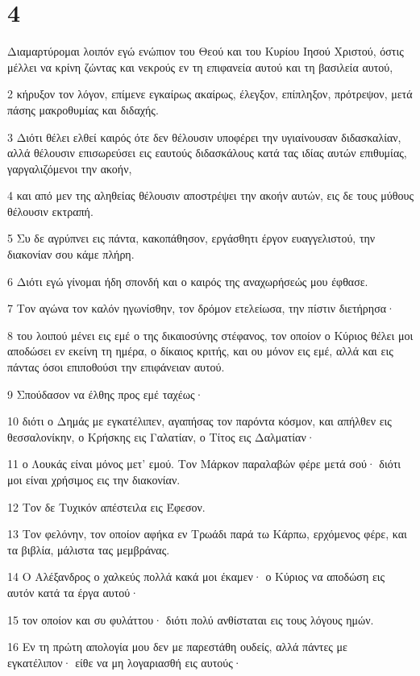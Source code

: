 \chapter{4}

\par Διαμαρτύρομαι λοιπόν εγώ ενώπιον του Θεού και του Κυρίου Ιησού Χριστού, όστις μέλλει να κρίνη ζώντας και νεκρούς εν τη επιφανεία αυτού και τη βασιλεία αυτού,
\par 2 κήρυξον τον λόγον, επίμενε εγκαίρως ακαίρως, έλεγξον, επίπληξον, πρότρεψον, μετά πάσης μακροθυμίας και διδαχής.
\par 3 Διότι θέλει ελθεί καιρός ότε δεν θέλουσιν υποφέρει την υγιαίνουσαν διδασκαλίαν, αλλά θέλουσιν επισωρεύσει εις εαυτούς διδασκάλους κατά τας ιδίας αυτών επιθυμίας, γαργαλιζόμενοι την ακοήν,
\par 4 και από μεν της αληθείας θέλουσιν αποστρέψει την ακοήν αυτών, εις δε τους μύθους θέλουσιν εκτραπή.
\par 5 Συ δε αγρύπνει εις πάντα, κακοπάθησον, εργάσθητι έργον ευαγγελιστού, την διακονίαν σου κάμε πλήρη.
\par 6 Διότι εγώ γίνομαι ήδη σπονδή και ο καιρός της αναχωρήσεώς μου έφθασε.
\par 7 Τον αγώνα τον καλόν ηγωνίσθην, τον δρόμον ετελείωσα, την πίστιν διετήρησα·
\par 8 του λοιπού μένει εις εμέ ο της δικαιοσύνης στέφανος, τον οποίον ο Κύριος θέλει μοι αποδώσει εν εκείνη τη ημέρα, ο δίκαιος κριτής, και ου μόνον εις εμέ, αλλά και εις πάντας όσοι επιποθούσι την επιφάνειαν αυτού.
\par 9 Σπούδασον να έλθης προς εμέ ταχέως·
\par 10 διότι ο Δημάς με εγκατέλιπεν, αγαπήσας τον παρόντα κόσμον, και απήλθεν εις θεσσαλονίκην, ο Κρήσκης εις Γαλατίαν, ο Τίτος εις Δαλματίαν·
\par 11 ο Λουκάς είναι μόνος μετ' εμού. Τον Μάρκον παραλαβών φέρε μετά σού· διότι μοι είναι χρήσιμος εις την διακονίαν.
\par 12 Τον δε Τυχικόν απέστειλα εις Έφεσον.
\par 13 Τον φελόνην, τον οποίον αφήκα εν Τρωάδι παρά τω Κάρπω, ερχόμενος φέρε, και τα βιβλία, μάλιστα τας μεμβράνας.
\par 14 Ο Αλέξανδρος ο χαλκεύς πολλά κακά μοι έκαμεν· ο Κύριος να αποδώση εις αυτόν κατά τα έργα αυτού·
\par 15 τον οποίον και συ φυλάττου· διότι πολύ ανθίσταται εις τους λόγους ημών.
\par 16 Εν τη πρώτη απολογία μου δεν με παρεστάθη ουδείς, αλλά πάντες με εγκατέλιπον· είθε να μη λογαριασθή εις αυτούς·
